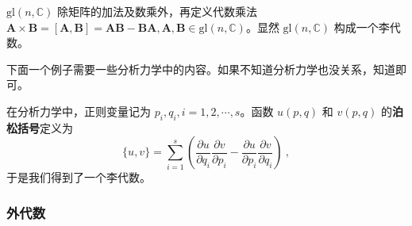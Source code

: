 \begin{example}{}
$\mathrm{gl}(n, \mathbb C)$ 除矩阵的加法及数乘外，再定义代数乘法 $\mathbf A\times \mathbf B=[\mathbf A, \mathbf B] = \mathbf A \mathbf B - \mathbf B\mathbf A, \mathbf A, \mathbf B\in \mathrm{gl}(n, \mathbb C)$。显然 $\mathrm{gl}(n,\mathbb C)$ 构成一个李代数。
\end{example}


下面一个例子需要一些分析力学中的内容。如果不知道分析力学也没关系，知道即可。
\begin{example}{}
在分析力学中，正则变量记为 $p_i,q_i, i=1,2,\cdots, s$。函数 $u(p,q)$ 和 $v(p, q)$ 的\textbf{泊松括号}定义为
\begin{equation}
\{u, v\}=\sum_{i=1}^{s}\left(\frac{\partial u}{\partial q_{i}} \frac{\partial v}{\partial p_{i}}-\frac{\partial u}{\partial p_{i}} \frac{\partial v}{\partial q_{i}}\right)~,
\end{equation}
于是我们得到了一个李代数。




\end{example}

\subsubsection{外代数}

